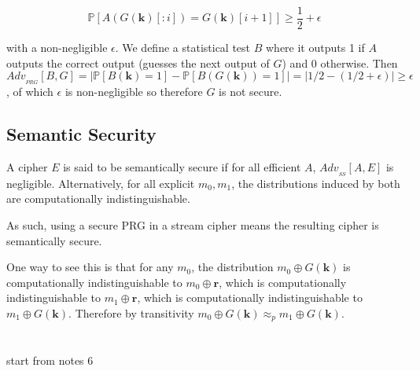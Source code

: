 \documentclass{article}
\begin{document}
\begin{multicols}{2}
$$
\mathbb{P}[A(G(\mathbf{k})[:i]) = G(\mathbf{k})[i+1]] \geq \frac{1}{2} + \epsilon
$$

with a non-negligible $\epsilon$. We define a statistical test $B$ where it outputs 1 if $A$ outputs the correct output (guesses the next output of $G$) and 0 otherwise. Then $Adv_{_{PRG}}[B,G] = |\mathbb{P}[B(\mathbf{k}) = 1] - \mathbb{P}[B(G(\mathbf{k})) = 1]| = | 1/2 - (1/2 + \epsilon)| \geq \epsilon$, of which $\epsilon$ is non-negligible so therefore $G$ is not secure.

\subsection {Semantic Security}

A cipher $E$ is said to be semantically secure if for all efficient $A$, $Adv_{_{SS}}[A,E]$ is negligible. Alternatively, for all explicit $m_0, m_1$, the distributions induced by both are computationally indistinguishable.

As such, using a secure PRG in a stream cipher means the resulting cipher is semantically secure.

One way to see this is that for any $m_0$, the distribution $m_0 \oplus G(\mathbf{k})$ is computationally indistinguishable to $m_0 \oplus \mathbf{r}$, which is computationally indistinguishable to $m_1 \oplus \mathbf{r}$, which is computationally indistinguishable to $m_1 \oplus G(\mathbf{k})$. Therefore by transitivity $m_0 \oplus G(\mathbf{k}) \approx_p m_1 \oplus G(\mathbf{k})$.

\section{}

start from notes 6

\end{multicols}
\end{document}
